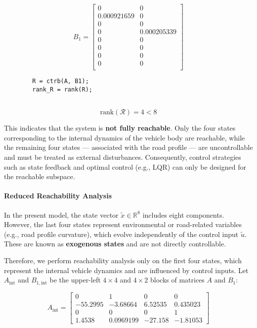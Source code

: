 \documentclass[]{report}
\begin{document}
	\[
	B_1 =
	\begin{bmatrix}
		0 & 0 \\
		0.000921659 & 0  \\
		0 & 0 \\
		0 & 0.000205339 \\
		0 & 0 \\
		0 & 0 \\
		0 & 0 \\
		0 & 0 \\
		
	\end{bmatrix}
	\]
	
	
	\begin{verbatim}
		R = ctrb(A, B1);
		rank_R = rank(R);
		
	\end{verbatim}
	
	\[
	\text{rank}(\mathcal{R}) = 4 < 8
	\]
	
	This indicates that the system is \textbf{not fully reachable}. Only the four states corresponding to the internal dynamics of the vehicle body are reachable, while the remaining four states — associated with the road profile — are uncontrollable and must be treated as external disturbances. Consequently, control strategies such as state feedback and optimal control (e.g., LQR) can only be designed for the reachable subspace.
	
	\paragraph{Reduced Reachability Analysis}
	
	In the present model, the state vector $\tilde{x} \in \mathbb{R}^8$ includes eight components. However, the last four states represent environmental or road-related variables (e.g., road profile curvature), which evolve independently of the control input $\tilde{u}$. These are known as \textbf{exogenous states} and are not directly controllable.
	
	Therefore, we perform reachability analysis only on the first four states, which represent the internal vehicle dynamics and are influenced by control inputs. Let $A_{\text{int}}$ and $B_{1, \text{int}}$ be the upper-left $4 \times 4$ and $4 \times 2$ blocks of matrices $A$ and $B_1$:
	
	\[
	A_{\text{int}} =
	\begin{bmatrix}
		0 & 1 & 0 & 0 \\
		-55.2995 & -3.68664 & 6.52535 & 0.435023 \\
		0 & 0 & 0 & 1 \\
		1.4538 & 0.0969199 & -27.158 & -1.81053 
	\end{bmatrix}
	\]
	
\end{document}

